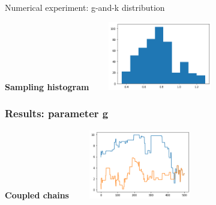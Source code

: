 \documentclass{beamer}
\begin{document}
\begin{section}{Numerical experiment: g-and-k distribution}
\begin{frame}
\begin{center}
		\vspace{0.2cm}
		
		\begin{minipage}{0.63\textwidth}
			\begin{center}
				{\scriptsize \textbf{Sampling histogram }}
				\includegraphics[width=6cm,height=3cm]{immagini_mario/b_hist}
			\end{center}
		\end{minipage}
	\end{center}
\end{frame}
\begin{frame}
	\frametitle{Results: parameter g}
	\begin{center}
		\begin{minipage}{0.63\textwidth}
			\begin{center}
				{\scriptsize \textbf{Coupled chains}}
				\includegraphics[width=6cm,height=3cm]{immagini_mario/g_chains}
			\end{center}
		\end{minipage}
		
		\vspace{0.2cm}
		

\end{center}
\end{frame}
\end{section}
\end{document}
